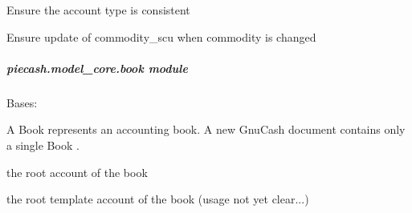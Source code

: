 \documentclass[letterpaper,10pt,english]{sphinxmanual}
\begin{document}
\begin{fulllineitems}
\begin{fulllineitems}
\label{api/piecash.model_core.account:piecash.model_core.account.Account.validate_account_type}
Ensure the account type is consistent

\end{fulllineitems}


\begin{fulllineitems}
\label{api/piecash.model_core.account:piecash.model_core.account.Account.validate_commodity}
Ensure update of commodity\_scu when commodity is changed

\end{fulllineitems}


\end{fulllineitems}



\subparagraph{piecash.model\_core.book module}
\label{api/piecash.model_core.book::doc}\label{api/piecash.model_core.book:module-piecash.model_core.book}\label{api/piecash.model_core.book:piecash-model-core-book-module}

\begin{fulllineitems}
\label{api/piecash.model_core.book:piecash.model_core.book.Book}
Bases: 

A Book represents an accounting book. A new GnuCash document contains only a single Book .

\begin{fulllineitems}
\label{api/piecash.model_core.book:piecash.model_core.book.Book.root_account}
the root account of the book

\end{fulllineitems}


\begin{fulllineitems}
\label{api/piecash.model_core.book:piecash.model_core.book.Book.root_template}
the root template account of the book (usage not yet clear...)

\end{fulllineitems}


\end{fulllineitems}
\end{document}
